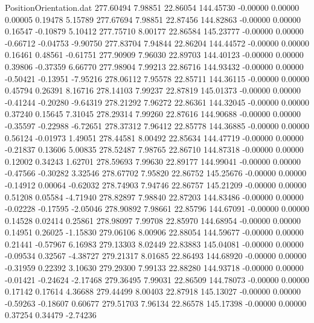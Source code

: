 \begin{filecontents}{PositionOrientation.dat}
 277.60494    7.98851   22.86054   144.45730   -0.00000    0.00000    0.00005    0.19478    5.15789
 277.67694    7.98851   22.87456   144.82863   -0.00000    0.00000    0.16547   -0.10879    5.10412
 277.75710    8.00177   22.86584   145.23777   -0.00000    0.00000   -0.66712   -0.04753   -9.90750
 277.83704    7.94844   22.86204   144.44572   -0.00000    0.00000    0.16461    0.48561   -0.61751
 277.90909    7.96030   22.89703   144.40123   -0.00000    0.00000    0.39806   -0.37359    6.66770
 277.98904    7.99213   22.86716   144.93432   -0.00000    0.00000   -0.50421   -0.13951   -7.95216
 278.06112    7.95578   22.85711   144.36115   -0.00000    0.00000    0.45794    0.26391    8.16716
 278.14103    7.99237   22.87819   145.01373   -0.00000    0.00000   -0.41244   -0.20280   -9.64319
 278.21292    7.96272   22.86361   144.32045   -0.00000    0.00000    0.37240    0.15645    7.31045
 278.29314    7.99260   22.87616   144.90688   -0.00000    0.00000   -0.35597   -0.22988   -6.72651
 278.37312    7.96412   22.85778   144.36885   -0.00000    0.00000    0.56124   -0.01973    1.49051
 278.44581    8.00492   22.85634   144.47719   -0.00000    0.00000   -0.21837    0.13606    5.00835
 278.52487    7.98765   22.86710   144.87318   -0.00000    0.00000    0.12002    0.34243    1.62701
 278.59693    7.99630   22.89177   144.99041   -0.00000    0.00000   -0.47566   -0.30282    3.32546
 278.67702    7.95820   22.86752   145.25676   -0.00000    0.00000   -0.14912    0.00064   -0.62032
 278.74903    7.94746   22.86757   145.21209   -0.00000    0.00000    0.51208    0.05584   -4.71940
 278.82897    7.98840   22.87203   144.83486   -0.00000    0.00000   -0.02228   -0.17595   -2.05046
 278.90892    7.98661   22.85796   144.67091   -0.00000    0.00000    0.14528    0.02414    0.25861
 278.98097    7.99708   22.85970   144.68954   -0.00000    0.00000    0.14951    0.26025   -1.15830
 279.06106    8.00906   22.88054   144.59677   -0.00000    0.00000    0.21441   -0.57967    6.16983
 279.13303    8.02449   22.83883   145.04081   -0.00000    0.00000   -0.09534    0.32567   -4.38727
 279.21317    8.01685   22.86493   144.68920   -0.00000    0.00000   -0.31959    0.22392    3.10630
 279.29300    7.99133   22.88280   144.93718   -0.00000    0.00000   -0.01421   -0.24624   -2.17468
 279.36495    7.99031   22.86509   144.78073   -0.00000    0.00000    0.17142    0.17614    4.36688
 279.44499    8.00403   22.87918   145.13027   -0.00000    0.00000   -0.59263   -0.18607    0.60677
 279.51703    7.96134   22.86578   145.17398   -0.00000    0.00000    0.37254    0.34479   -2.74236

\end{filecontents}
